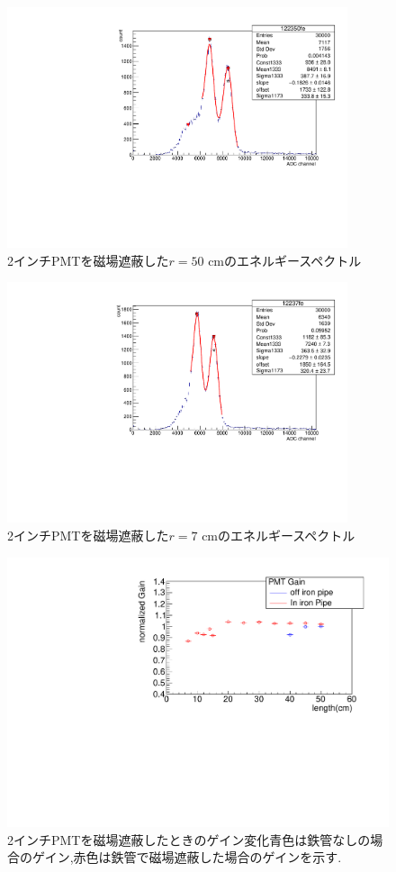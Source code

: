 \begin{figure}[tbp]
	\centering
		\includegraphics[clip,angle=-90,width=10cm]{fig/iguchi/122350fe.pdf}
	\caption{2インチPMTを磁場遮蔽した$r=50$ cmのエネルギースペクトル}
	\label{hist50fe}
\end{figure}
\begin{figure}[tbp]
	\centering
		\includegraphics[clip,angle=-90,width=10cm]{fig/iguchi/12237fe.pdf}
	\caption{2インチPMTを磁場遮蔽した$r=7$ cmのエネルギースペクトル}
	\label{hist7fe}
\end{figure}

\begin{figure}[tbp]
	\centering
		\includegraphics[angle=-90,width=15cm]{fig/iguchi/bigPMTfit.pdf}
	\caption{2インチPMTを磁場遮蔽したときのゲイン変化\newline 青色は鉄管なしの場合のゲイン,赤色は鉄管で磁場遮蔽した場合のゲインを示す.}
	\label{bigPMTfit}
\end{figure}

